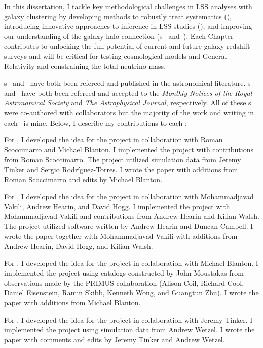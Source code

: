 In this dissertation, I tackle key methodological challenges in LSS analyses
with galaxy clustering by developing methods to robustly treat systematics (), 
introducing innovative approaches to inference in LSS studies (), and 
improving our understanding of the galaxy-halo connection 
(\chapname s~ and~). Each Chapter contributes to unlocking 
the full potential of current and future galaxy redshift surveys and will be
critical for testing cosmological models and General Relativity and 
constraining the total neutrino mass. 

\chapname s~ and~ have both been refereed and
published in the astronomical literature.
\chapname s~ and~ have both been refereed and accepted 
to the \emph{Monthly Notices of the Royal Astronomical Society} and \emph{The Astrophysical Journal},
respectively. All of these \chapname s were co-authored with collaborators but the majority
of the work and writing in each \chapname\ is mine. Below, I describe my contributions to each \chapname:
\begin{enumerate}

{\item 
For , I developed the idea for the project in collaboration with Roman
Scoccimarro and Michael Blanton. I implemented the project with contributions 
from Roman Scoccimarro. The project utilized simulation data from Jeremy Tinker
and Sergio Rodr\'{i}guez-Torres. I wrote the paper with additions from 
Roman Scoccimarro and edits by Michael Blanton. 
}

{\item 
For , I developed the idea for the project in collaboration with 
Mohammadjavad Vakili, Andrew Hearin, and David Hogg. I implemented the project 
with Mohammadjavad Vakili and contributions from Andrew Hearin and Kilian Walsh.
The project utilized software written by Andrew Hearin and Duncan Campell. 
I wrote the paper together with Mohammadjavad Vakili with additions from
Andrew Hearin, David Hogg, and Kilian Walsh.
}

{\item 
For , I developed the idea for the project in collaboration with 
Michael Blanton. I implemented the project using catalogs constructed by 
John Moustakas from observations made by the PRIMUS collaboration (Alison Coil,
Richard Cool, Daniel Eisenstein, Ramin Skibb, Kenneth Wong, and Guangtun Zhu).
I wrote the paper with additions from Michael Blanton. 
}

{\item 
For , I developed the idea for the project in collaboration with 
Jeremy Tinker. I implemented the project using simulation data from Andrew 
Wetzel. I wrote the paper with comments and edits by Jeremy Tinker and Andrew 
Wetzel. 
}
\end{enumerate}
